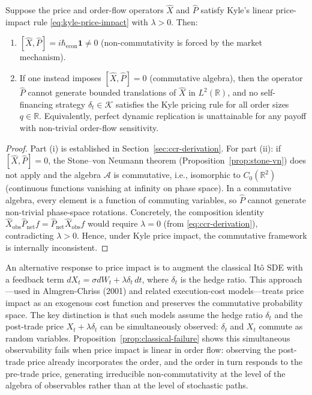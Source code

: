 \begin{proposition}
\label{prop:classical-failure}
Suppose the price and order-flow operators $\hat{X}$ and $\hat{P}$ satisfy
Kyle's linear price-impact rule \eqref{eq:kyle-price-impact} with $\lambda > 0$.
Then:
\begin{enumerate}
    \item[(i)] $[\hat{X}, \hat{P}] = i\hbar_{\mathrm{econ}}\mathbf{1} \neq 0$
        (non-commutativity is forced by the market mechanism).
    \item[(ii)] If one instead imposes $[\hat{X}, \hat{P}] = 0$ (commutative
        algebra), then the operator $\hat{P}$ cannot generate bounded translations
        of $\hat{X}$ in $L^2(\mathbb{R})$, and no self-financing strategy
        $\delta_t \in \mathcal{K}$ satisfies the Kyle pricing rule for all order
        sizes $q \in \mathbb{R}$. Equivalently, perfect dynamic replication
        is unattainable for any payoff with non-trivial order-flow sensitivity.
\end{enumerate}
\end{proposition}

\begin{proof}
Part (i) is established in Section~\ref{sec:ccr-derivation}.
For part (ii): if $[\hat{X}, \hat{P}] = 0$, the Stone--von Neumann theorem
(Proposition~\ref{prop:stone-vn}) does not apply and the algebra $\mathcal{A}$
is commutative, i.e., isomorphic to $C_0(\mathbb{R}^2)$ (continuous functions
vanishing at infinity on phase space). In a commutative algebra, every element
is a function of commuting variables, so $\hat{P}$ cannot generate non-trivial
phase-space rotations. Concretely, the composition identity
$\hat{X}_{\mathrm{obs}}\hat{P}_{\mathrm{net}}f = \hat{P}_{\mathrm{net}}\hat{X}_{\mathrm{obs}}f$
would require $\lambda = 0$ (from \eqref{eq:ccr-derivation}), contradicting
$\lambda > 0$. Hence, under Kyle price impact, the commutative framework is
internally inconsistent.
\end{proof}

\begin{remark}
\label{rem:why-not-sde}
An alternative response to price impact is to augment the classical It\^o SDE
with a feedback term $dX_t = \sigma dW_t + \lambda \delta_t\,dt$, where
$\delta_t$ is the hedge ratio. This approach---used in Almgren-Chriss (2001)
and related execution-cost models---treats price impact as an exogenous cost
function and preserves the commutative probability space. The key distinction
is that such models assume the hedge ratio $\delta_t$ and the post-trade
price $X_t + \lambda\delta_t$ can be simultaneously observed: $\delta_t$
and $X_t$ commute as random variables. Proposition~\ref{prop:classical-failure}
shows this simultaneous observability fails when price impact is linear in
order flow: observing the post-trade price already incorporates the order,
and the order in turn responds to the pre-trade price, generating irreducible
non-commutativity at the level of the algebra of observables rather than at the
level of stochastic paths.
\end{remark}

